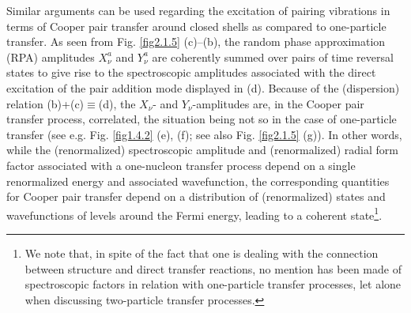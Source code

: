 Similar arguments can be used regarding the excitation of pairing vibrations in terms of Cooper pair transfer around closed shells as compared to one-particle transfer. As seen from Fig. \ref{fig2.1.5} (c)--(b), the random phase approximation (RPA) amplitudes $X_\nu^a$ and $Y^a_\nu$ are coherently summed over pairs of time reversal states to give rise to the spectroscopic amplitudes associated with the direct excitation of the pair addition mode displayed in (d). Because of the (dispersion) relation (b)+(c)$\equiv$(d), the $X_\nu$- and $Y_\nu$-amplitudes are, in the Cooper pair transfer process, correlated, the situation being not so in the case of one-particle transfer (see e.g. Fig. \ref{fig1.4.2} (e), (f); see also Fig. \ref{fig2.1.5} (g)). In other words, while the (renormalized) spectroscopic amplitude and (renormalized) radial form factor associated with a one-nucleon transfer process depend on a single renormalized energy and associated wavefunction, the corresponding quantities for Cooper pair transfer depend on a distribution of (renormalized) states and  wavefunctions of levels around the Fermi energy, leading to a coherent state\footnote{We note that, in spite of the fact that one is dealing with the connection between structure and direct transfer reactions, no mention has been made of spectroscopic factors in relation with one-particle transfer processes, let alone when discussing two-particle transfer processes.}. 
